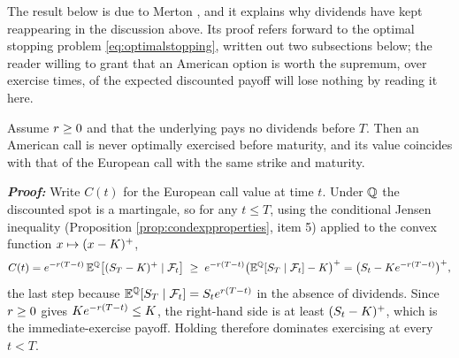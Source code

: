 
The result below is due to Merton \cite{merton1973}, and it explains why dividends have kept
reappearing in the discussion above. Its proof refers forward to the optimal stopping problem
\eqref{eq:optimalstopping}, written out two subsections below; the reader willing to grant that an
American option is worth the supremum, over exercise times, of the expected discounted payoff will
lose nothing by reading it here.

\begin{proposition}\label{prop:mertonnoearly}
Assume $r \geq 0$ and that the underlying pays no dividends before $T$. Then an American call is
never optimally exercised before maturity, and its value coincides with that of the European call
with the same strike and maturity.
\end{proposition}

\textbf{\textit{Proof:}} Write $C(t)$ for the European call value at time $t$. Under $\mathbb{Q}$ the
discounted spot is a martingale, so for any $t \leq T$, using the conditional Jensen inequality
(Proposition \ref{prop:condexpproperties}, item 5) applied to the convex function $x \mapsto (x-K)^+$,
\[
C(t) = e^{-r(T-t)}\,\mathbb{E}^{\mathbb{Q}}\bigl[(S_T-K)^+ \mid \mathcal{F}_t\bigr]
\;\geq\; e^{-r(T-t)}\bigl(\mathbb{E}^{\mathbb{Q}}[S_T\mid\mathcal{F}_t]-K\bigr)^{+}
= \bigl(S_t - K e^{-r(T-t)}\bigr)^{+},
\]
the last step because $\mathbb{E}^{\mathbb{Q}}[S_T\mid\mathcal{F}_t] = S_t e^{r(T-t)}$ in the absence of dividends.
Since $r \geq 0$ gives $K e^{-r(T-t)} \leq K$, the right-hand side is at least
$(S_t - K)^{+}$, which is the immediate-exercise payoff. Holding therefore dominates
exercising at every $t < T$.


